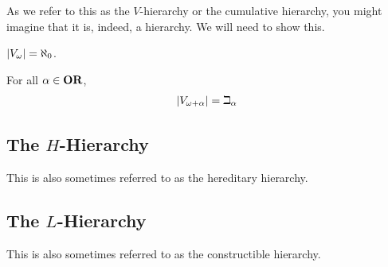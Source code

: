 As we refer to this as the $V$-hierarchy or the cumulative hierarchy, you might imagine that it is, indeed, a hierarchy. We will need to show this.

\begin{lemma}
  $\left\lvert V_{\omega} \right\rvert = \aleph_0$.
\end{lemma}

\begin{lemma}
  For all $\alpha \in \mathbf{OR}$,
  \begin{align*}
    \left\lvert V_{\omega + \alpha} \right\rvert = \beth_{\alpha}
  \end{align*}
\end{lemma}

\subsection{The $H$-Hierarchy}

This is also sometimes referred to as the hereditary hierarchy.

\subsection{The $L$-Hierarchy}

This is also sometimes referred to as the constructible hierarchy.
